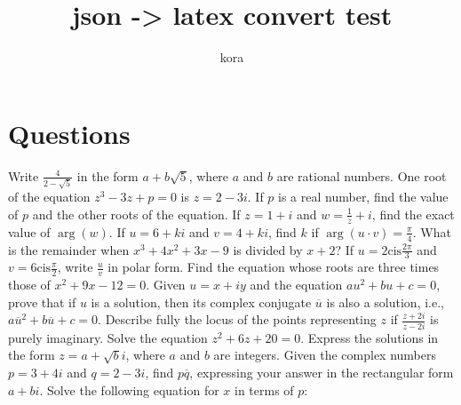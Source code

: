 \documentclass[12pt,addpoints]{exam}
\begin{document}
\title{json -> latex convert test}
\author{kora}
\date{}
\maketitle
\section*{Questions}
\begin{questions}
\pointsinrightmargin
\bracketedpoints
\question[5] Write \(\frac{4}{2 - \sqrt{5}}\) in the form \(a + b\sqrt{5}\), where \(a\) and \(b\) are rational numbers.
\fillwithlines{3cm}
\question[5] One root of the equation \( z^3 - 3z + p = 0 \) is \( z = 2 - 3i \). If \( p \) is a real number, find the value of \( p \) and the other roots of the equation.
\fillwithlines{3cm}
\question[5] If \( z = 1 + i \) and \( w = \frac{1}{z} + i \), find the exact value of \(\arg(w)\).
\fillwithlines{3cm}
\question[5] If \( u = 6 + ki \) and \( v = 4 + ki \), find \( k \) if \(\arg(u \cdot v) = \frac{\pi}{4}\).
\fillwithlines{3cm}
\question[5] What is the remainder when \( x^3 + 4x^2 + 3x - 9 \) is divided by \( x + 2 \)?
\fillwithlines{3cm}
\question[5] If \( u = 2 \text{cis} \frac{2\pi}{3} \) and \( v = 6 \text{cis} \frac{\pi}{2} \), write \( \frac{u}{v} \) in polar form.
\fillwithlines{3cm}
\question[5] Find the equation whose roots are three times those of \( x^2 + 9x - 12 = 0 \).
\fillwithlines{3cm}
\question[5] Given \( u = x + iy \) and the equation \( au^2 + bu + c = 0 \), prove that if \( u \) is a solution, then its complex conjugate \( \overline{u} \) is also a solution, i.e., \( a\overline{u}^2 + b\overline{u} + c = 0 \).
\fillwithlines{3cm}
\question[5] Describe fully the locus of the points representing \( z \) if \(\frac{z + 2i}{z - 2i}\) is purely imaginary.
\fillwithlines{3cm}
\question[5] Solve the equation \( z^2 + 6z + 20 = 0 \). Express the solutions in the form \( z = a + \sqrt{b}i \), where \( a \) and \( b \) are integers.
\fillwithlines{3cm}
\question[5] Given the complex numbers \( p = 3 + 4i \) and \( q = 2 - 3i \), find \( p\overline{q} \), expressing your answer in the rectangular form \( a + bi \).
\fillwithlines{3cm}
\question[5] Solve the following equation for \( x \) in terms of \( p \):


\end{questions}
\end{document}
